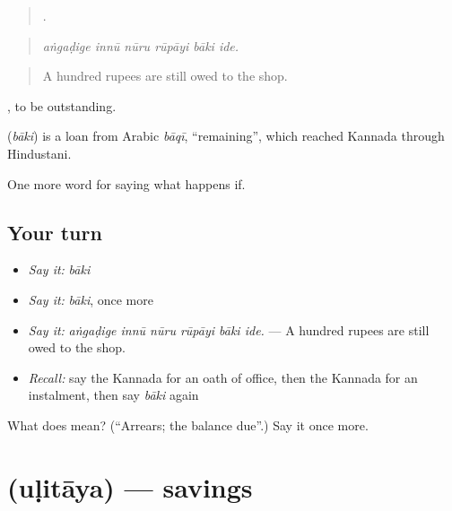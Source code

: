 \begin{quote}
     .
\end{quote}

\begin{quote}
\emph{aṅgaḍige innū nūru rūpāyi bāki ide.}
\end{quote}

\begin{quote}
A hundred rupees are still owed to the shop.
\end{quote}

 , to be outstanding.

\begin{cousinweb}
\textbf{} (\emph{bāki}) is a loan from Arabic \emph{bāqī}, \textquotedblleft{}remaining\textquotedblright{}, which reached Kannada through Hindustani.
\end{cousinweb}

\begin{grammarlens}[title={What you've built}]
One more word for saying what happens if.
\end{grammarlens}

\subsection*{Your turn}
\begin{itemize}
\raggedright
  \item \emph{Say it:} \emph{bāki}
  \item \emph{Say it:} \emph{bāki}, once more
  \item \emph{Say it:} \emph{aṅgaḍige innū nūru rūpāyi bāki ide.} — A hundred rupees are still owed to the shop.
  \item \emph{Recall:} say the Kannada for an oath of office, then the Kannada for an instalment, then say \emph{bāki} again
\end{itemize}

\begin{tcolorbox}[breakable,colback=teal!4,colframe=teal!35!black,title={Before you move on}]
What does  mean? (\textquotedblleft{}Arrears; the balance due\textquotedblright{}.) Say it once more.
\end{tcolorbox}
\section[\texorpdfstring{\kn{ಉಳಿತಾಯ} (uḷitāya)}{ಉಳಿತಾಯ (uḷitāya)}]{ (uḷitāya) — savings}

